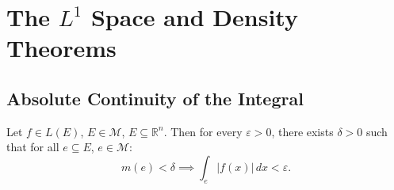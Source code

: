 \documentclass[11pt]{report}
\begin{document}
\newpage
\section{The $L^1$ Space and Density Theorems}

\subsection{Absolute Continuity of the Integral}

\begin{thmbox}
Let $f \in L(E)$, $E \in \mathcal{M}$, $E \subseteq \mathbb{R}^n$. Then for every $\varepsilon > 0$, there exists $\delta > 0$ such that for all $e \subseteq E$, $e \in \mathcal{M}$:
\[
m(e) < \delta \implies \int_e |f(x)|\,dx < \varepsilon.
\]
\end{thmbox}
\end{document}
